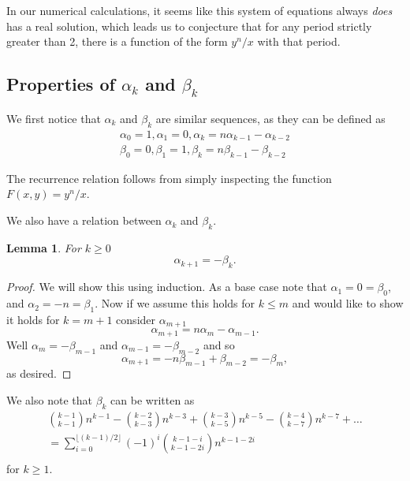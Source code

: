 \documentclass[12pt]{article}
\newtheorem{lemma}{Lemma}
\begin{document}
In our numerical calculations, it seems like this system of equations always \emph{does} has a real solution, which leads us to conjecture that for any period strictly greater than 2, there is a function of the form $y^n/x$ with that period.

\subsection{Properties of $\alpha_k$ and $\beta_k$}

We first notice that $\alpha_k$ and $\beta_k$ are similar sequences, as they can be defined as
\begin{align*}
\alpha_0 = 1, \alpha_1 = 0, \alpha_k = n\alpha_{k-1} - \alpha_{k-2}\\
\beta_0 = 0, \beta_1 = 1, \beta_k = n\beta_{k-1} - \beta_{k-2}
\end{align*}

The recurrence relation follows from simply inspecting the function $F(x,y) = y^n/x$.

We also have a relation between $\alpha_k$ and $\beta_k$. 
\begin{lemma} 
\label{ab} For $k\geq 0$
\begin{equation*}
\alpha_{k+1} = - \beta_{k}.
\end{equation*}
\end{lemma}
\begin{proof}
We will show this using induction. As a base case note that $\alpha_1 = 0 = \beta_0$, and $\alpha_2 = -n = \beta_1$. Now if we assume this holds for $k \leq m$ and would like to show it holds for $k = m+1$ consider $\alpha_{m+1}$
\begin{equation*}
\alpha_{m+1} = n \alpha_{m} - \alpha_{m-1}.
\end{equation*}
Well $\alpha_m = -\beta_{m-1}$ and $\alpha_{m-1} = - \beta_{m-2}$ and so 
\begin{equation*}
\alpha_{m+1} = - n \beta_{m-1} + \beta_{m-2} = -\beta_{m},
\end{equation*}
as desired.
\end{proof}

We also note that $\beta_k$ can be written as 
\begin{align*}
\binom{k-1}{k-1} n^{k-1} - \binom{k-2}{k-3}n^{k-3} +\binom{k-3}{k-5}n^{k-5} -\binom{k-4}{k-7}n^{k-7} + \dots \\
=\sum_{i = 0}^{\lfloor (k-1)/2 \rfloor} (-1)^i\binom{k-1-i}{k-1-2i}n^{k-1-2i}\\
\end{align*}
for $k \geq 1$.
\end{document}
